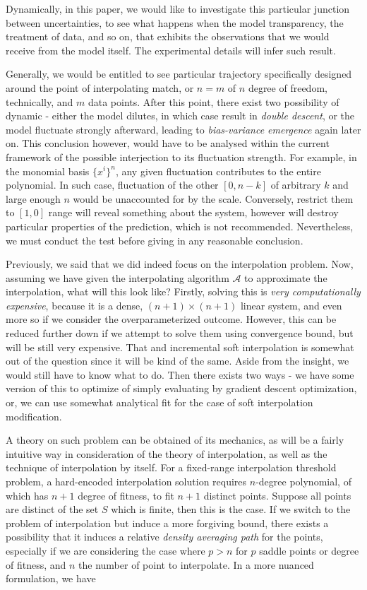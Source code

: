 \documentclass[
  journal=largetwo,
  year=2025,
  volume=37,
]{cup-journal}
\begin{document}
Dynamically, in this paper, we would like to investigate this particular junction between uncertainties, to see what happens when the model transparency, the treatment of data, and so on, that exhibits the observations that we would receive from the model itself. The experimental details will infer such result. 

Generally, we would be entitled to see particular trajectory specifically designed around the point of interpolating match, or $n=m$ of $n$ degree of freedom, technically, and $m$ data points. After this point, there exist two possibility of dynamic - either the model dilutes, in which case result in \textit{double descent}, or the model fluctuate strongly afterward, leading to \textit{bias-variance emergence} again later on. This conclusion however, would have to be analysed within the current framework of the possible interjection to its fluctuation strength. For example, in the monomial basis $\{x^{i}\}^{n}$, any given fluctuation contributes to the entire polynomial. In such case, fluctuation of the other $[0,n-k]$ of arbitrary $k$ and large enough $n$ would be unaccounted for by the scale. Conversely, restrict them to $[1,0]$ range will reveal something about the system, however will destroy particular properties of the prediction, which is not recommended. Nevertheless, we must conduct the test before giving in any reasonable conclusion.

Previously, we said that we did indeed focus on the interpolation problem. Now, assuming we have given the interpolating algorithm $\mathcal{A}$ to approximate the interpolation, what will this look like? Firstly, solving this is \textit{very computationally expensive}, because it is a dense, $(n+1)\times(n+1)$ linear system, and even more so if we consider the overparameterized outcome. However, this can be reduced further down if we attempt to solve them using convergence bound, but will be still very expensive. That and incremental soft interpolation is somewhat out of the question since it will be kind of the same. Aside from the insight, we would still have to know what to do. Then there exists two ways - we have some version of this to optimize of simply evaluating by gradient descent optimization, or, we can use somewhat analytical fit for the case of soft interpolation modification. 

A theory on such problem can be obtained of its mechanics, as will be a fairly intuitive way in consideration of the theory of interpolation, as well as the technique of interpolation by itself. For a fixed-range interpolation threshold problem, a hard-encoded interpolation solution requires $n$-degree polynomial, of which has $n+1$ degree of fitness, to fit $n+1$ distinct points. Suppose all points are distinct of the set $S$ which is finite, then this is the case. If we switch to the problem of interpolation but induce a more forgiving bound, there exists a possibility that it induces a relative \textit{density averaging path} for the points, especially if we are considering the case where $p>n$ for $p$ saddle points or degree of fitness, and $n$ the number of point to interpolate. In a more nuanced formulation, we have
\end{document}
